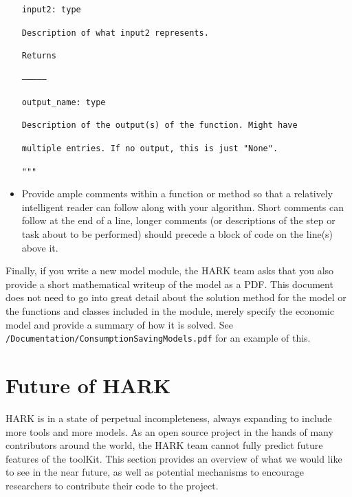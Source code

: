 \documentclass[12pt,titlepage,letterpaper]{econtex}
\begin{document}
\begin{itemize}
\hspace{0.9cm}\texttt{input2: type}

\hspace{1.8cm}\texttt{Description of what input2 represents.}

\vspace{0.5cm}

\hspace{0.9cm}\texttt{Returns}

\hspace{0.9cm}\texttt{--------------}

\hspace{0.9cm}\texttt{output\_name: type}

\hspace{1.8cm}\texttt{Description of the output(s) of the function.  Might have}

\hspace{1.8cm}\texttt{multiple entries.  If no output, this is just "None".}  

\hspace{0.9cm}\texttt{"""}

\item Provide ample comments within a function or method so that a relatively intelligent reader can follow along with your algorithm.  Short comments can follow at the end of a line, longer comments (or descriptions of the step or task about to be performed) should precede a block of code on the line(s) above it.
\end{itemize}

Finally, if you write a new model module, the HARK team asks that you also provide a short mathematical writeup of the model as a PDF.  This document does not need to go into great detail about the solution method for the model or the functions and classes included in the module, merely specify the economic model and provide a summary of how it is solved.  See \texttt{/Documentation/ConsumptionSavingModels.pdf} for an example of this.

\section{Future of HARK}\label{sec:FutureOfHARK}

HARK is in a state of perpetual incompleteness, always expanding to include more tools and more models.  As an open source project in the hands of many contributors around the world, the HARK team cannot fully predict future features of the toolKit.  This section provides an overview of what we would like to see in the near future, as well as potential mechanisms to encourage researchers to contribute their code to the project.
\end{document}
